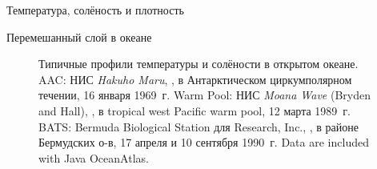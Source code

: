 \begin{chapter}{Температура, солёность и плотность}
\begin{section}{Перемешанный слой в океане}
\begin{figure}[t!]
\caption{Типичные профили температуры и солёности в открытом океане.
AAC: НИС \textit{Hakuho Maru}, ,  
в Антарктическом циркумполярном течении, 16 января 1969~г.
Warm Pool: НИС \textit{Moana Wave} (Bryden and Hall), , 
 в tropical west Pacific warm pool, 12 марта 1989~г.
BATS: Bermuda Biological Station для Research, Inc., ,
 в районе Бермудских о-в, 17 апреля и 10 сентября 1990~г.
Data are included with Java OceanAtlas.}
\label{fig:TandSProfile}
\end{figure}
%


\end{section}
\end{chapter}

